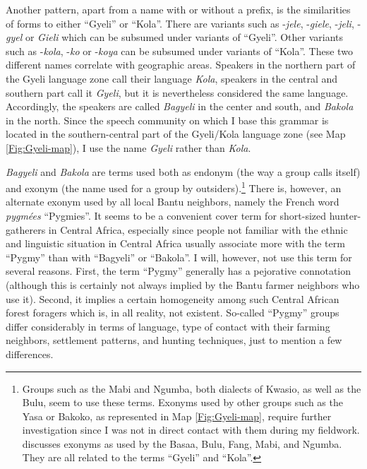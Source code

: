 Another pattern, apart from a name with or without a prefix, is the similarities of forms to either ``Gyeli'' or ``Kola''. There are variants such as -{\itshape jele}, -{\itshape giele}, -{\itshape jeli}, -{\itshape gyel} or {\itshape Gieli} which can be subsumed under variants of ``Gyeli''. Other variants such as -{\itshape kola}, -{\itshape ko} or -{\itshape koya} can be subsumed under variants of ``Kola''. %
These two different names correlate with geographic areas. 
Speakers in the northern part of the Gyeli language zone call their language {\itshape Kola}, speakers in the central and southern part call it {\itshape Gyeli}, but it is nevertheless considered the same language. Accordingly, the speakers are called {\itshape Bagyeli} in the center and south, and {\itshape Bakola} in the north. Since the speech community on which I base this grammar is located in the southern-central part of the Gyeli/Kola language zone (see Map \ref{Fig:Gyeli-map}), I use the name {\itshape Gyeli} rather than {\itshape Kola}.

{\itshape Bagyeli} and {\itshape Bakola} are terms used both as endonym (the way a group calls itself) and exonym (the name used for a group by outsiders).\footnote{Groups such as the Mabi and Ngumba, both dialects of Kwasio, as well as the Bulu, seem to use these terms. Exonyms used by other groups such as the Yasa or Bakoko, as represented in Map \ref{Fig:Gyeli-map}, require further investigation since I was not in direct contact with them during my fieldwork. \citet[29-30]{renaud76} discusses exonyms as used by the Basaa, Bulu, Fang, Mabi, and Ngumba. They are all related to the terms ``Gyeli'' and ``Kola''.} There is, however, an alternate exonym used by all local Bantu neighbors, namely the French word \textit{pygmées} ``Pygmies''. It seems to be a convenient cover term for short-sized hunter-gatherers in Central Africa, especially since people not familiar with the ethnic and linguistic situation in Central Africa usually associate more with the term ``Pygmy'' than with ``Bagyeli'' or ``Bakola''. I will, however, not use this term for several reasons. First, the term ``Pygmy'' generally has a pejorative connotation (although this is certainly not always implied by the Bantu farmer neighbors who use it). Second, it implies a certain homogeneity among such Central African forest foragers which is, in all reality, not existent. So-called ``Pygmy'' groups differ considerably in terms of language, type of contact with their farming neighbors, settlement patterns, and hunting techniques, just to mention a few differences.

